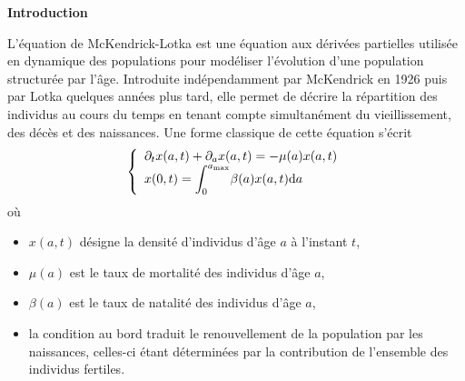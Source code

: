 
\vspace*{1cm}

\begin{center}
    \Large\textbf{Introduction}
\end{center}

L'équation de McKendrick-Lotka est une équation aux dérivées partielles utilisée en dynamique des populations pour modéliser l'évolution d'une population structurée par l'âge. Introduite indépendamment par McKendrick en 1926 puis par Lotka quelques années plus tard, elle permet de décrire la répartition des individus au cours du temps en tenant compte simultanément du vieillissement, des décès et des naissances. Une forme classique de cette équation s'écrit
\begin{equation*}
\left\{\begin{array}{l}
    \partial_t x(a,t)+\partial_a x(a,t)=-\mu(a)x(a,t) \\
    x(0,t) = \displaystyle{\int_0^{a_{\max}}}\beta(a)x(a,t)\mathrm{d} a
\end{array}\right.
\end{equation*}
où
\begin{itemize}
\item $x(a,t)$ désigne la densité d'individus d'âge $a$ à l'instant $t$,
\item $\mu(a)$ est le taux de mortalité des individus d'âge $a$,
\item $\beta(a)$ est le taux de natalité des individus d'âge $a$,
\item la condition au bord traduit le renouvellement de la population par les naissances, celles-ci étant déterminées par la contribution de l'ensemble des individus fertiles.
\end{itemize}

